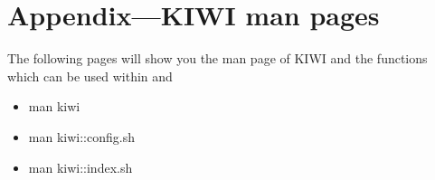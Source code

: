 \chapter{Appendix---KIWI man pages}
\label{chapter:Appendix}
\minitoc

The following pages will show you the man page of KIWI and the
functions which can be used within  and 

\begin{itemize}
  \item{man kiwi}
  \item{man kiwi::config.sh}
  \item{man kiwi::index.sh}
\end{itemize}
